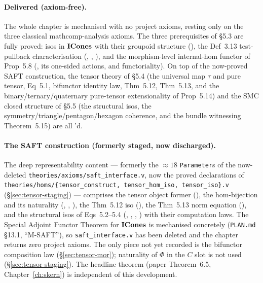 \paragraph{Delivered (axiom-free).}
The whole chapter is mechanised with no project axioms, resting only on
the three classical mathcomp-analysis axioms. The three prerequisites of
\S5.3 are fully proved: isos in $\mathbf{ICones}$ with their groupoid structure
(), the Def~3.13 test-pullback
characterisation
(,
,
), and the
morphism-level internal-hom functor of Prop~5.8
(, its one-sided
actions, and functoriality). On top of the now-proved SAFT construction,
the tensor theory of \S5.4 (the universal map $\tau$ and pure tensor,
Eq~5.1, bifunctor identity law, Thm~5.12, Thm~5.13, and the
binary/ternary/quaternary pure-tensor extensionality of Prop~5.14) and
the SMC closed structure of \S5.5 (the structural isos, the
symmetry/triangle/pentagon/hexagon coherence, and the bundle
 witnessing Theorem~5.15) are all
\Qed{}'d.

\paragraph{The SAFT construction (formerly staged, now discharged).}
The deep representability content --- formerly the $\approx 18$
\texttt{Parameter}s of the now-deleted
\texttt{theories/axioms/saft\_interface.v}, now the proved declarations of
\texttt{theories/homs/\{tensor\_construct, tensor\_hom\_iso,
tensor\_iso\}.v} (\S\ref{sec:tensor-staging}) --- comprises the tensor
object former (), the hom-bijection and
its naturality (,
,
), the Thm~5.12
iso (), the Thm~5.13 norm
equation (), and the structural
isos of Eqs~5.2--5.4
(,
,
,
) with their computation
laws. The Special Adjoint Functor Theorem for $\mathbf{ICones}$ is mechanised
concretely (\texttt{PLAN.md} \S13.1, ``M-SAFT''), so
\texttt{saft\_interface.v} has been deleted and the chapter returns zero
project axioms. The only piece not yet recorded is the bifunctor
composition law (\S\ref{sec:tensor-mor}); naturality of $\Phi$ in the
$C$ slot is not used (\S\ref{sec:tensor-staging}). The headline theorem
(paper Theorem~6.5, Chapter~\ref{ch:skern}) is independent of this
development.
